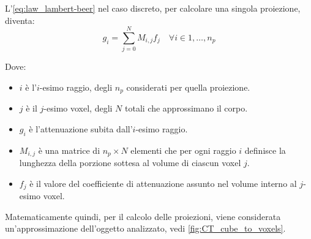 \documentclass[12pt,a4paper]{report}
\begin{document}
L'\autoref{eq:law_lambert-beer} nel caso discreto, per calcolare una singola proiezione, diventa:
\begin{equation} \label{eq:law_lambert-beer_discrete}
  g_i = \sum_{j=0}^N M_{i, j} f_j \quad \forall i \in 1, \dots, n_p
\end{equation}

Dove:
\begin{itemize}
  \item \(i\) è l'\(i\)-esimo raggio, degli \(n_p\) considerati per quella proiezione.
  \item \(j\) è il \(j\)-esimo voxel, degli \(N\) totali che approssimano il corpo.
  \item \(g_i\) è l'attenuazione subita dall'\(i\)-esimo raggio.
  \item \(M_{i,j}\) è una matrice di \(n_p \times N\) elementi che per ogni raggio \(i\) definisce la lunghezza della porzione
        sottesa al volume di ciascun voxel \(j\).
  \item \(f_j\) è il valore del coefficiente di attenuazione assunto nel volume interno al \(j\)-esimo voxel.
\end{itemize}

Matematicamente quindi, per il calcolo delle proiezioni, viene considerata un'approssimazione dell'oggetto analizzato, vedi
\autoref{fig:CT_cube_to_voxels}.
\end{document}
